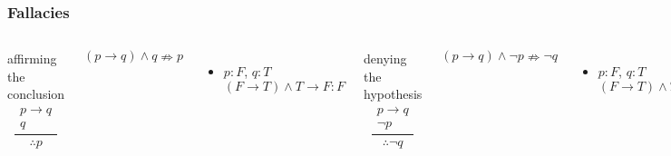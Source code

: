 \documentclass[dvipsnames]{beamer}
\begin{document}
\begin{frame}
  \frametitle{Fallacies}

  \begin{columns}[t]
    \begin{block}{affirming the conclusion}
      \[
      \frac
        {
        \begin{array}{c}
          p \rightarrow q\\
          q
          \end{array}
        }
        {
          \therefore p
        }
      \]
    \end{block}

    $(p \rightarrow q) \wedge q \nRightarrow p$
    \begin{itemize}
     \item $p: F$, $q: T$
      \smallskip
      $(F \rightarrow T) \wedge T \rightarrow F: F$
    \end{itemize}

    \pause
    \begin{block}{denying the hypothesis}
      \[
      \frac
        {
          \begin{array}{c}
            p \rightarrow q\\
            \neg p
          \end{array}
        }
        {
          \therefore \neg q
        }
      \]
    \end{block}

    $(p \rightarrow q) \wedge \neg p \nRightarrow \neg q$
    \begin{itemize}
     \item $p: F$, $q: T$
      \smallskip
      $(F \rightarrow T) \wedge T \rightarrow F: F$
    \end{itemize}
  \end{columns}
\end{frame}
\end{document}
